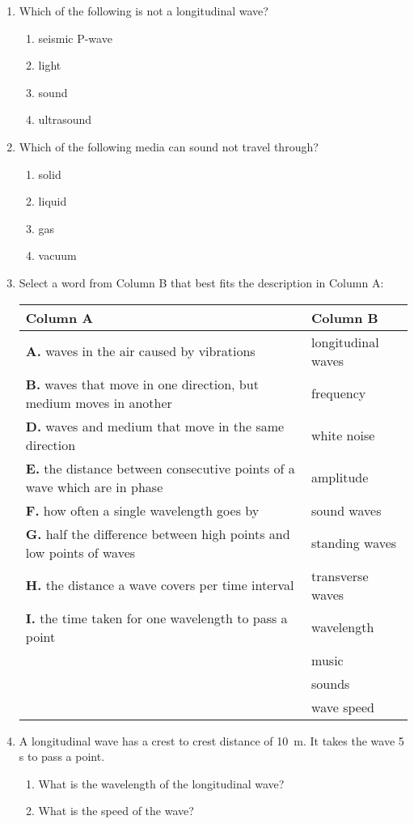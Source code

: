 \begin{eocexercises}{}
\begin{enumerate}
\item{Which of the following is not a longitudinal wave?
\begin{enumerate}
\item{seismic P-wave}
\item{light}
\item{sound}
\item{ultrasound}
\end{enumerate}}

\item{Which of the following media can sound not travel through?
\begin{enumerate}
\item solid
\item liquid
\item gas
\item vacuum
\end{enumerate}}

\item{Select a word from Column B that best fits the description in Column A:

\begin{center}
\begin{tabular}{|p{6cm}|l|}\hline
\textbf{Column A} & \textbf{Column B} \\ \hline
\textbf{A.} waves in the air caused by vibrations & longitudinal waves \\ \hline
\textbf{B.} waves that move in one direction, but medium moves in another & frequency \\ \hline
\textbf{D.} waves and medium that move in the same direction & white noise \\ \hline
\textbf{E.} the distance between consecutive points of a wave which are in phase & amplitude \\ \hline
\textbf{F.} how often a single wavelength goes by & sound waves \\ \hline
\textbf{G.} half the difference between high points and low points of waves & standing waves \\ \hline
\textbf{H.} the distance a wave covers per time interval & transverse waves \\ \hline
\textbf{I.} the time taken for one wavelength to pass a point & wavelength \\ \hline
& music \\ \hline
& sounds \\ \hline
& wave speed \\ \hline
\end{tabular}
\end{center}
}
\item{A longitudinal wave has a crest to crest distance of 10~m. It takes the wave 5 s to pass a point.
\begin{enumerate}
\item What is the wavelength of the longitudinal wave?
\item What is the speed of the wave?
\end{enumerate}}


\end{enumerate}
\end{eocexercises}
